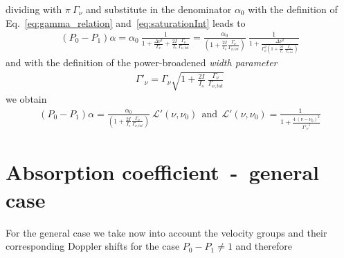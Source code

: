 dividing with \(\pi~\Gamma_\nu \) and substitute in the denominator \(\alpha_0 \) 
with the definition of Eq.~\eqref{eq:gamma_relation} and~\eqref{eq:saturationInt} 
leads to
\begin{align}
    (P_0-P_1)\alpha = \alpha_0~\frac{1}
    {1 + \frac{\Delta\nu^2}{\Gamma_\nu} + \frac{2I}{I_s}\frac{\Gamma_\nu}{\Gamma_{\nu,tot}} } 
    = \frac{\alpha_0}{(1 + \frac{2I}{I_s}\frac{\Gamma_\nu}{\Gamma_{\nu,tot}})}~
    \frac{1}{1+ \frac{\Delta\nu^2}
    {\Gamma_\nu^2 \left(1 + \frac{2I}{I_s}~\frac{\Gamma_\nu}{\Gamma_{\nu,tot}} \right)}}
\end{align}
and with the definition of the power-broadened \textit{width parameter}
\begin{align}
    \Gamma'_\nu = \Gamma_\nu \sqrt{1 + \frac{2I}{I_s}~\frac{\Gamma_\nu}{\Gamma_{\nu,tot}} }
\end{align}
we obtain
\begin{align}\label{eq:kappa_weak}
    (P_0-P_1)\alpha = 
    \frac{\alpha_0}{ \left( 1 + \frac{2I}{I_s}\frac{\Gamma_\nu}{\Gamma_{\nu,tot}} \right )}~
    \mathcal{L}'(\nu,\nu_0)~~\text{and}~~\mathcal{L}'(\nu,\nu_0)= 
    \frac{1}{1+ \frac{{4~(\nu-\nu_0)}^2}{{\Gamma'_\nu}^2}}
\end{align}

\section{Absorption coefficient~-~general case}  %

For the general case we take now into account the velocity groups and their 
corresponding Doppler shifts for the case \(P_0-P_1 \neq 1 \) and therefore 

